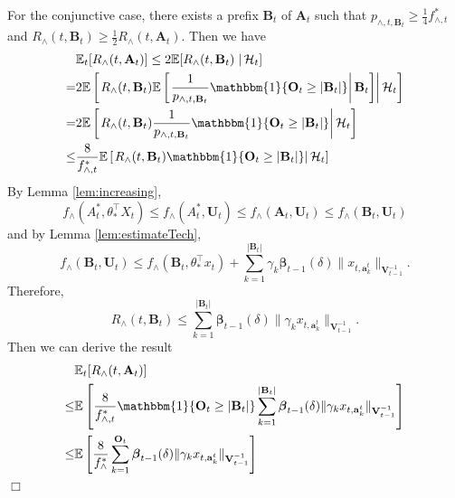\documentclass{article}
\newcommand{\bbeta}{\boldsymbol{\beta}}
\newcommand{\EE}{\mathbb{E}}
\newcommand{\bOne}{\mathbbm{1}}
\newcommand{\bA}{\mathbf{A}}
\newcommand{\ba}{\mathbf{a}}
\newcommand{\bB}{\mathbf{B}}
\newcommand{\bO}{\mathbf{O}}
\newcommand{\bU}{\mathbf{U}}
\newcommand{\bV}{\mathbf{V}}
\newcommand{\cH}{\mathcal{H}}
\newcommand{\abs}[1]{\left| #1 \right|}
\newcommand{\norm}[1]{\| #1 \|}
\newenvironment{proof}{\noindent {\textbf{Proof. }}}{$\Box$ \medskip}
\begin{document}
\begin{proof}
For the conjunctive case, there exists a prefix $\bB_t$ of $\bA_t$ such that $p_{\wedge, t, \bB_t} \geq \frac{1}{4}f_{\wedge, t}^*$ and $R_{\wedge}(t, \bB_t) \geq \frac{1}{2} R_{\wedge}(t, \bA_t)$. Then we have
\begin{align*}
&\EE_t[R_{\wedge}(t, \bA_t)] \leq 2 \EE[R_{\wedge}(t, \bB_t) \left. \right| \cH_t]\\
=& 2 \EE \left[ \left. R_{\wedge}(t, \bB_t) \EE \left[ \left. \frac{1}{p_{\wedge, t, \bB_t}} \bOne\{\bO_t\geq\abs{\bB_t}\} \right| \bB_t \right]  \right| \cH_t \right]\\
=& 2\EE \left[ \left. R_{\wedge}(t, \bB_t) \frac{1}{p_{\wedge, t, \bB_t}} \bOne\{\bO_t\geq\abs{\bB_t}\}  \right| \cH_t \right]\\
\leq &\frac{8}{f_{\wedge, t}^{\ast}} \EE \left[ \left. R_{\wedge}(t, \bB_t) \bOne\{\bO_t\geq\abs{\bB_t}\}  \right| \cH_t \right]
\end{align*}
By Lemma \ref{lem:increasing},
$$
f_{\wedge}(A_t^*, \theta_*^{\top}X_t) \leq f_{\wedge}(A_t^*,\bU_t) \leq f_{\wedge}(\bA_t,\bU_t) \leq f_{\wedge}(\bB_t,\bU_t)
$$
and by Lemma \ref{lem:estimateTech},
$$
f_{\wedge}(\bB_t,\bU_t) \leq f_{\wedge}(\bB_t, \theta_*^{\top}x_t) + \sum_{k=1}^{\abs{\bB_t}}\gamma_k\bbeta_{t-1}(\delta)\norm{x_{t,\ba_k^t}}_{\bV_{t-1}^{-1}}.
$$
Therefore,
$$
R_{\wedge}(t, \bB_t) \leq \sum_{k=1}^{\abs{\bB_t}}\bbeta_{t-1}(\delta)\norm{\gamma_k x_{t,\ba_k^t}}_{\bV_{t-1}^{-1}}.
$$
Then we can derive the result
\begin{align*}
&\EE_t[R_{\wedge}(t, \bA_t)] \\
\leq& \EE \left[\frac{8}{f_{\wedge, t}^*} \bOne\{ \bO_t \geq \abs{\bB_t} \}\sum_{k=1}^{\abs{\bB_t}}\bbeta_{t-1}(\delta)\norm{\gamma_k x_{t,\ba_k^t}}_{\bV_{t-1}^{-1}} \right]\\
\leq& \EE \left[ \frac{8}{f_{\wedge}^*} \sum_{k=1}^{ \bO_t } \bbeta_{t-1}(\delta) \norm{\gamma_k x_{t,\ba_k^t}}_{\bV_{t-1}^{-1}} \right]
\end{align*}
\end{proof}
	
\end{document}
